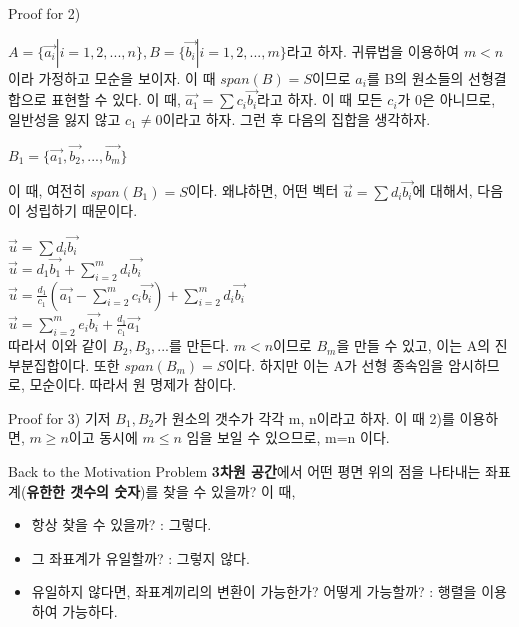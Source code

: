 \documentclass{beamer}
\begin{document}
\begin{frame}{Proof for 2)}

$A = \{\vec{a_i}|i=1,2,...,n\}, B = \{\vec{b_i}|i=1,2,...,m\}$라고 하자. 귀류법을 이용하여 $m<n$이라 가정하고 모순을 보이자. 이 때 $span(B) = S$이므로 $a_i$를 B의 원소들의 선형결합으로 표현할 수 있다. 이 때, $\vec{a_1} = \sum c_i \vec{b_i}$라고 하자. 이 때 모든 $c_i$가 0은 아니므로, 일반성을 잃지 않고 $c_1\neq 0$이라고 하자. 그런 후 다음의 집합을 생각하자. 

$B_1 = \{\vec{a_1}, \vec{b_2}, ... , \vec{b_m}\}$

이 때, 여전히 $span(B_1) = S$이다. 왜냐하면, 어떤 벡터 $\vec{u} = \sum d_i \vec{b_i}$에 대해서, 다음이 성립하기 때문이다. 


$\vec{u}  =  \sum d_i \vec{b_i}$ \\ 
$\vec{u} =  d_1 \vec{b_1} + \sum^m_{i=2} d_i \vec{b_i}$\\
$\vec{u} = \frac{d_1}{c_1}(\vec{a_1} - \sum^m_{i=2} c_i \vec{b_i}) + \sum^m_{i=2} d_i \vec{b_i} $\\
$\vec{u} = \sum^m_{i=2} e_i \vec{b_i} + \frac{d_1}{c_1} \vec{a_1}$ \\

따라서 이와 같이  $B_2, B_3, ...$를 만든다. $m<n$이므로 $B_m$을 만들 수 있고, 이는 A의 진부분집합이다. 또한 $span(B_m)=S$이다. 하지만 이는 A가 선형 종속임을 암시하므로, 모순이다. 따라서 원 명제가 참이다. 

\end{frame}

\begin{frame}{Proof for 3)}
기저 $B_1, B_2$가 원소의 갯수가 각각 m, n이라고 하자. 이 때 2)를 이용하면, $m \geq n$이고 동시에 $m \leq n$ 임을 보일 수 있으므로, m=n 이다.
\end{frame}


\begin{frame}{Back to the Motivation Problem}  
\textbf{3차원 공간}에서 어떤 평면 위의 점을 나타내는 좌표계(\textbf{유한한 갯수의 숫자})를 찾을 수 있을까? 이 때, 

\begin{itemize} 
\item 항상 찾을 수 있을까? : 그렇다. 
\item 그 좌표계가 유일할까? : 그렇지 않다. 
\item 유일하지 않다면, 좌표계끼리의 변환이 가능한가? 어떻게 가능할까? : 행렬을 이용하여 가능하다. 
\end{itemize}
 
\end{frame}
\end{document}
